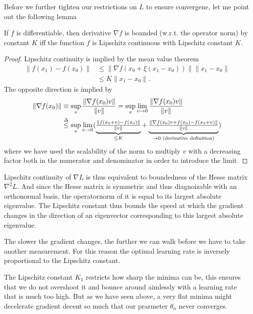 Before we further tighten our restrictions on \(L\) to ensure convergene, let
me point out the following lemma
%
\begin{lemma}
	If \(f\) is differentiable, then derivative \(\nabla f\) is
	bounded (w.r.t. the operator norm) by constant \(K\) iff the function
	\(f\) is Lipschitz continuous with Lipschitz constant \(K\).
\end{lemma}
\begin{proof}
	Lipschitz continuity is implied by the mean value theorem
	\begin{align*}
		\|f(x_1) - f(x_0)\|
		&\le \|\nabla f(x_0 + \xi(x_1-x_0))\| \|x_1- x_0\|\\
		&\le K \|x_1-x_0\|.
	\end{align*}
	The opposite direction is implied by
	\begin{align*}
		\|\nabla f(x_0)\|
		&\equiv \sup_{v} \frac{\|\nabla f(x_0)v\|}{\|v\|}
		= \sup_{v} \lim_{v\to 0}\frac{\|\nabla f(x_0)v\|}{\|v\|}\\
		&\lxle{\Delta}\sup_{v} \lim_{v\to 0}
		(
			\underbrace{
				\tfrac{\|f(x_0 + v) - f(x_0) \|}{\|v\|}
			}_{
				\le K
			}
			+ \underbrace{
				\tfrac{\|\nabla f(x_0)v + f(x_0) - f(x_0 +v)\|}{\|v\|}
			}_{
				\to 0 \text{ (derivative definition)}
			}
		)
	\end{align*}
	where we have used the scalability of the norm to multiply \(v\) with a
	decreasing factor both in the numerator and denominator in order to introduce
	the limit.
\end{proof}

Lipschitz continuity of \(\nabla L\) is thus equivalent to boundedness of the
Hesse matrix \(\nabla^2 L\). And since the Hesse matrix is symmetric and thus
diagnoizable with an orthonormal basis, the operatornorm of it is equal to its
largest absolute eigenvalue. The Lipschitz constant thus bounds the speed at
which the gradient changes in the direction of an eigenvector corresponding to
this largest absolute eigenvalue.

The slower the gradient changes, the further we can walk before we have to
take another measurement. For this reason the optimal learning rate is
inversely proportional to the Lipschitz constant.

The Lipschitz constant \(K_1\) restricts how sharp the minima can be, 
this ensures that we do not overshoot it and bounce around aimlessly with a 
learning rate that is much too high. But as we have seen above, a very flat
minima might decelerate gradient decent so much that our prarmeter \(\theta_n\)
never converges.

